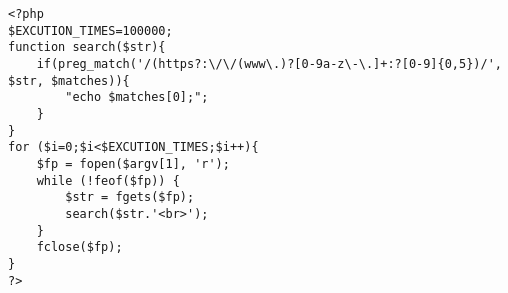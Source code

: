 \begin{lstlisting}[label={fig:s-php}, caption={PHP 正規表現}, basicstyle=\ttfamily\footnotesize, frame=single]
<?php
$EXCUTION_TIMES=100000;
function search($str){
    if(preg_match('/(https?:\/\/(www\.)?[0-9a-z\-\.]+:?[0-9]{0,5})/', $str, $matches)){
        "echo $matches[0];";
    }
}
for ($i=0;$i<$EXCUTION_TIMES;$i++){
    $fp = fopen($argv[1], 'r');
    while (!feof($fp)) {
        $str = fgets($fp);
        search($str.'<br>');
    }
    fclose($fp);
}
?>
\end{lstlisting}